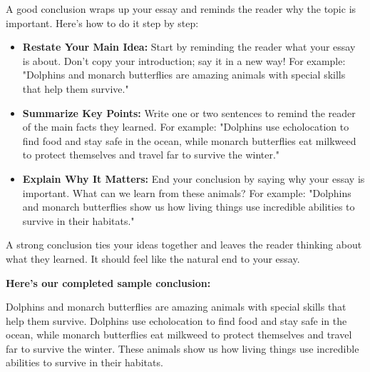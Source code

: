 \documentclass[12pt]{article}
\begin{document}
\begin{tcolorbox}[colframe=black!60, colback=white, 
coltitle=black, colbacktitle=black!15, fonttitle=\bfseries\Large, 
title=Example: How to Write a Conclusion, halign title=center, left=10pt, right=10pt, top=10pt, bottom=15pt]
A good conclusion wraps up your essay and reminds the reader why the topic is important. Here’s how to do it step by step:
\begin{itemize}
    \item \textbf{Restate Your Main Idea:} Start by reminding the reader what your essay is about. Don’t copy your introduction; say it in a new way! For example: "Dolphins and monarch butterflies are amazing animals with special skills that help them survive."
    \item \textbf{Summarize Key Points:} Write one or two sentences to remind the reader of the main facts they learned. For example: "Dolphins use echolocation to find food and stay safe in the ocean, while monarch butterflies eat milkweed to protect themselves and travel far to survive the winter."
    \item \textbf{Explain Why It Matters:} End your conclusion by saying why your essay is important. What can we learn from these animals? For example: "Dolphins and monarch butterflies show us how living things use incredible abilities to survive in their habitats."
\end{itemize}

A strong conclusion ties your ideas together and leaves the reader thinking about what they learned. It should feel like the natural end to your essay.

\vspace{1em}

\textbf{Here’s our completed sample conclusion:}

Dolphins and monarch butterflies are amazing animals with special skills that help them survive. Dolphins use echolocation to find food and stay safe in the ocean, while monarch butterflies eat milkweed to protect themselves and travel far to survive the winter. These animals show us how living things use incredible abilities to survive in their habitats.
\end{tcolorbox}


\vspace{1em}
\end{document}
